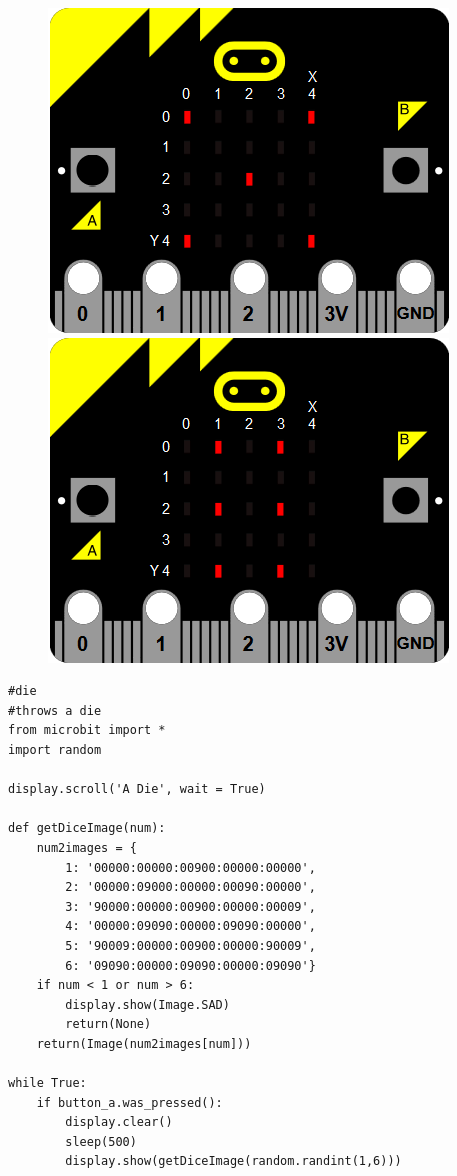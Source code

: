 \documentclass[11pt]{article}
\begin{document}
\begin{figure}[!h]
\begin{center}
\includegraphics[scale=0.3]{die5.png}\includegraphics[scale=0.3]{die6.png}
\end{center}
\end{figure}

\begin{lstlisting}
#die
#throws a die
from microbit import *
import random

display.scroll('A Die', wait = True)

def getDiceImage(num):
    num2images = {
        1: '00000:00000:00900:00000:00000',
        2: '00000:09000:00000:00090:00000',
        3: '90000:00000:00900:00000:00009',
        4: '00000:09090:00000:09090:00000',
        5: '90009:00000:00900:00000:90009',
        6: '09090:00000:09090:00000:09090'}
    if num < 1 or num > 6:
        display.show(Image.SAD)
        return(None)
    return(Image(num2images[num]))
 
while True:
    if button_a.was_pressed():
        display.clear()
        sleep(500)
        display.show(getDiceImage(random.randint(1,6)))
\end{lstlisting}
\end{document}
